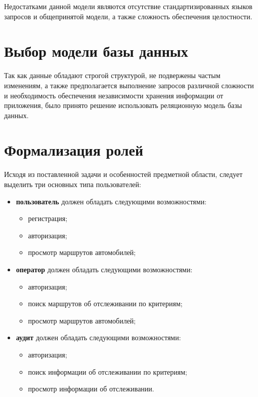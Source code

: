 Недостатками данной модели являются отсутствие стандартизированных языков запросов и общепринятой модели, а также сложность обеспечения
целостности.

\section{Выбор модели базы данных}

Так как данные обладают строгой структурой, не подвержены частым изменениям, а также предполагается выполнение запросов различной сложности и необходимость обеспечения независимости хранения информации от приложения, было принято решение использовать реляционную модель базы данных.

\section{Формализация ролей}

Исходя из поставленной задачи и особенностей предметной области, следует выделить три основных типа пользователей:

\begin{itemize}[label=---]
    \item \textbf{пользователь} должен обладать следующими возможностями:
    \begin{itemize}[label=---]
        \item регистрация;
        \item авторизация;
        \item просмотр маршрутов автомобилей;
    \end{itemize}
    \item \textbf{оператор} должен обладать следующими возможностями:
    \begin{itemize}[label=---]
        \item авторизация;
        \item поиск маршрутов об отслеживании по критериям;
        \item просмотр маршрутов автомобилей;
    \end{itemize}
    \item \textbf{аудит} должен обладать следующими возможностями:
    \begin{itemize}[label=---]
        \item авторизация;
        \item поиск информации об отслеживании по критериям;
        \item просмотр информации об отслеживании.
    \end{itemize}
\end{itemize}

